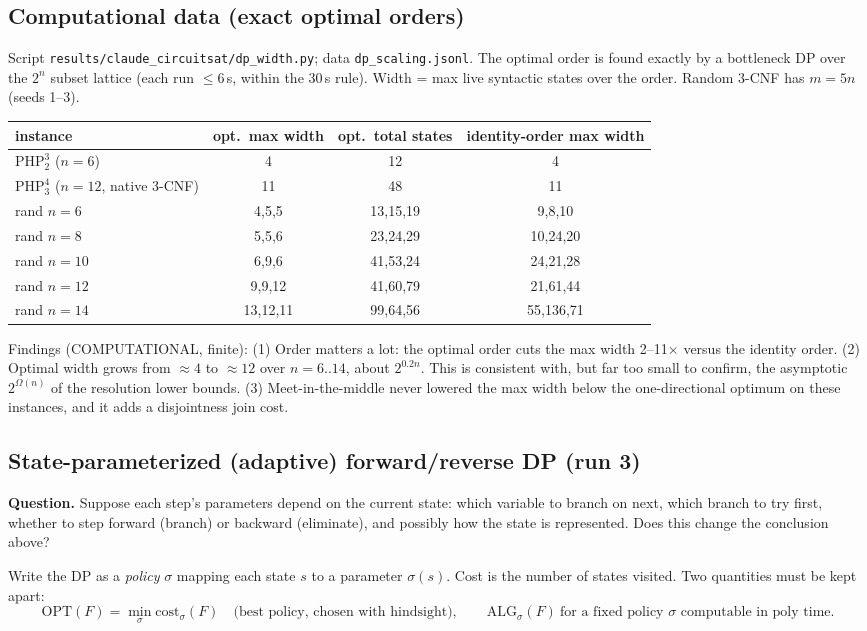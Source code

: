 \documentclass[11pt]{article}
\begin{document}
\subsection{Computational data (exact optimal orders)}
Script \texttt{results/claude\_circuitsat/dp\_width.py}; data \texttt{dp\_scaling.jsonl}.
The optimal order is found exactly by a bottleneck DP over the $2^n$ subset lattice (each run
$\le6$\,s, within the 30\,s rule). Width = max live syntactic states over the order. Random
3-CNF has $m=5n$ (seeds 1--3).
\begin{center}\begin{tabular}{@{}lccc@{}}\toprule
instance & opt.\ max width & opt.\ total states & identity-order max width\\\midrule
$\mathrm{PHP}^3_2$ ($n=6$) & 4 & 12 & 4\\
$\mathrm{PHP}^4_3$ ($n=12$, native 3-CNF) & 11 & 48 & 11\\
rand $n=6$ & 4,5,5 & 13,15,19 & 9,8,10\\
rand $n=8$ & 5,5,6 & 23,24,29 & 10,24,20\\
rand $n=10$ & 6,9,6 & 41,53,24 & 24,21,28\\
rand $n=12$ & 9,9,12 & 41,60,79 & 21,61,44\\
rand $n=14$ & 13,12,11 & 99,64,56 & 55,136,71\\\bottomrule
\end{tabular}\end{center}
Findings (COMPUTATIONAL, finite):
(1) Order matters a lot: the optimal order cuts the max width 2--11$\times$ versus the identity order.
(2) Optimal width grows from $\approx4$ to $\approx12$ over $n=6..14$, about $2^{0.2n}$. This
is consistent with, but far too small to confirm, the asymptotic $2^{\Omega(n)}$ of the
resolution lower bounds.
(3) Meet-in-the-middle never lowered the max width below the one-directional optimum on
these instances, and it adds a disjointness join cost.

\subsection{State-parameterized (adaptive) forward/reverse DP (run 3)}
\label{sec:adaptive}
\textbf{Question.} Suppose each step's parameters depend on the current state: which
variable to branch on next, which branch to try first, whether to step forward (branch) or
backward (eliminate), and possibly how the state is represented. Does this change the conclusion above?

Write the DP as a \emph{policy} $\sigma$ mapping each state $s$ to a parameter $\sigma(s)$.
Cost is the number of states visited. Two quantities must be kept apart:
\[
\mathrm{OPT}(F)=\min_{\sigma}\mathrm{cost}_\sigma(F)\quad\text{(best policy, chosen with hindsight)},\qquad
\mathrm{ALG}_\sigma(F)\ \text{for a fixed policy }\sigma\text{ computable in poly time}.
\]
\end{document}
